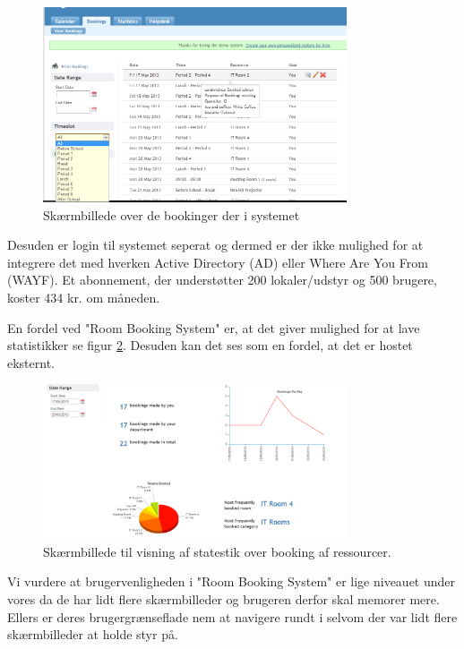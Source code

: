 \begin{figure}[h!]
  \centering
    \includegraphics[width=0.8\textwidth]{Appendix/GUI-Prototype/RoomBookingSystemList}
  \caption{Skærmbillede over de bookinger der i systemet}
\label{Comparison_RBS_RoomBookingSystemList}
\end{figure}

Desuden er login til systemet seperat og dermed er der ikke mulighed for at integrere det med hverken Active Directory (AD) eller Where Are You From (WAYF). Et abonnement, der understøtter 200 lokaler/udstyr og 500 brugere, koster 434 kr. om måneden.

En fordel ved "Room Booking System" er, at det giver mulighed for at lave statistikker se figur \ref{Comparison_RBS_RoomBookingSystemStatistic}. Desuden kan det ses som en fordel, at det er hostet eksternt.

\begin{figure}[h!]
  \centering
    \includegraphics[width=0.8\textwidth]{Appendix/GUI-Prototype/RoomBookingSystemStatistic}
  \caption{Skærmbillede til visning af statestik over booking af ressourcer.}
\label{Comparison_RBS_RoomBookingSystemStatistic}
\end{figure}

Vi vurdere at brugervenligheden i "Room Booking System" er lige niveauet under vores da de har lidt flere skærmbilleder og brugeren derfor skal memorer mere. Ellers er deres brugergrænseflade nem at navigere rundt i selvom der var lidt flere skærmbilleder at holde styr på. 


